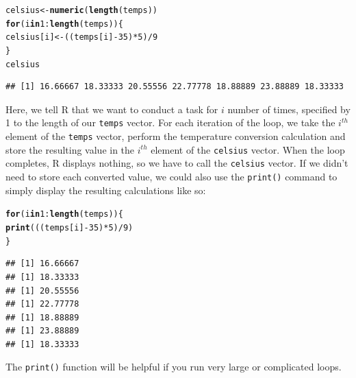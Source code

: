 \documentclass[12pt]{article}\usepackage[]{graphicx}\usepackage[]{color}
\makeatletter
\newcommand{\hlnum}[1]{\textcolor[rgb]{0.686,0.059,0.569}{#1}}%
\newcommand{\hlopt}[1]{\textcolor[rgb]{0,0,0}{#1}}%
\newcommand{\hlstd}[1]{\textcolor[rgb]{0.345,0.345,0.345}{#1}}%
\newcommand{\hlkwa}[1]{\textcolor[rgb]{0.161,0.373,0.58}{\textbf{#1}}}%
\newcommand{\hlkwb}[1]{\textcolor[rgb]{0.69,0.353,0.396}{#1}}%
\newcommand{\hlkwd}[1]{\textcolor[rgb]{0.737,0.353,0.396}{\textbf{#1}}}%
\newenvironment{kframe}{%
 \def\at@end@of@kframe{}%
 \ifinner\ifhmode%
  \def\at@end@of@kframe{\end{minipage}}%
  \begin{minipage}{\columnwidth}%
 \fi\fi%
 \def\FrameCommand##1{\hskip\@totalleftmargin \hskip-\fboxsep
 \colorbox{shadecolor}{##1}\hskip-\fboxsep
     \hskip-\linewidth \hskip-\@totalleftmargin \hskip\columnwidth}%
 \MakeFramed {\advance\hsize-\width
   \@totalleftmargin\z@ \linewidth\hsize
   \@setminipage}}%
 {\par\unskip\endMakeFramed%
 \at@end@of@kframe}
\newenvironment{knitrout}{}{} %
\makeatother
\begin{document}
\begin{knitrout}
\color{fgcolor}\begin{kframe}
\begin{alltt}
\hlstd{celsius} \hlkwb{<-} \hlkwd{numeric}\hlstd{(}\hlkwd{length}\hlstd{(temps))}
\hlkwa{for} \hlstd{(i} \hlkwa{in} \hlnum{1}\hlopt{:}\hlkwd{length}\hlstd{(temps)) \{}
        \hlstd{celsius[i]} \hlkwb{<-} \hlstd{((temps[i]}\hlopt{-}\hlnum{35}\hlstd{)}\hlopt{*}\hlnum{5}\hlstd{)}\hlopt{/}\hlnum{9}
\hlstd{\}}
\hlstd{celsius}
\end{alltt}
\begin{verbatim}
## [1] 16.66667 18.33333 20.55556 22.77778 18.88889 23.88889 18.33333
\end{verbatim}
\end{kframe}
\end{knitrout}
Here, we tell R that we want to conduct a task for $i$ number of times, specified by 1 to the length of our \texttt{temps} vector. For each iteration of the loop, we take the $i^{th}$ element of the \texttt{temps} vector, perform the temperature conversion calculation and store the resulting value in the $i^{th}$ element of the \texttt{celsius} vector. When the loop completes, R displays nothing, so we have to call the \texttt{celsius} vector. If we didn't need to store each converted value, we could also use the \texttt{print()} command to simply display the resulting calculations like so:

\begin{knitrout}
\color{fgcolor}\begin{kframe}
\begin{alltt}
\hlkwa{for} \hlstd{(i} \hlkwa{in} \hlnum{1}\hlopt{:}\hlkwd{length}\hlstd{(temps)) \{}
        \hlkwd{print}\hlstd{(((temps[i]}\hlopt{-}\hlnum{35}\hlstd{)}\hlopt{*}\hlnum{5}\hlstd{)}\hlopt{/}\hlnum{9}\hlstd{)}
\hlstd{\}}
\end{alltt}
\begin{verbatim}
## [1] 16.66667
## [1] 18.33333
## [1] 20.55556
## [1] 22.77778
## [1] 18.88889
## [1] 23.88889
## [1] 18.33333
\end{verbatim}
\end{kframe}
\end{knitrout}
The \texttt{print()} function will be helpful if you run very large or complicated loops.
\end{document}
